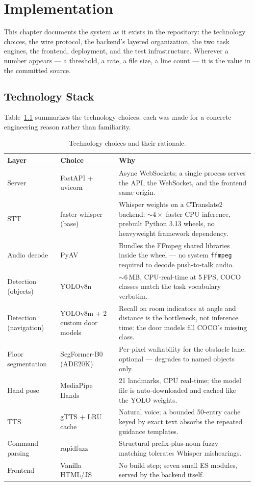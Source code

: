 \chapter{Implementation}
\label{ch:implementation}

This chapter documents the system as it exists in the repository: the technology
choices, the wire protocol, the backend's layered organization, the two task
engines, the frontend, deployment, and the test infrastructure. Wherever a number
appears --- a threshold, a rate, a file size, a line count --- it is the value in
the committed source.

\section{Technology Stack}
\label{sec:tech_stack}

Table~\ref{tab:stack} summarizes the technology choices; each was made for a
concrete engineering reason rather than familiarity.

\begin{table}[!htbp]
\centering
\caption{Technology choices and their rationale.}
\label{tab:stack}
\small
\begin{tabular}{p{2.6cm} p{3.2cm} p{7.0cm}}
\toprule
\textbf{Layer} & \textbf{Choice} & \textbf{Why} \\
\midrule
Server & FastAPI + uvicorn & Async WebSockets; a single process serves the API, the WebSocket, and the frontend same-origin. \\
STT & faster-whisper (base) & Whisper weights on a CTranslate2 backend: ${\sim}4\times$ faster CPU inference, prebuilt Python 3.13 wheels, no heavyweight framework dependency. \\
Audio decode & PyAV & Bundles the FFmpeg shared libraries inside the wheel --- no system \texttt{ffmpeg} required to decode push-to-talk audio. \\
Detection (objects) & YOLOv8n & ${\sim}6$\,MB, CPU-real-time at 5\,FPS, COCO classes match the task vocabulary verbatim. \\
Detection (navigation) & YOLOv8m + 2 custom door models & Recall on room indicators at angle and distance is the bottleneck, not inference time; the door models fill COCO's missing class. \\
Floor segmentation & SegFormer-B0 (ADE20K) & Per-pixel walkability for the obstacle lane; optional --- degrades to named objects only. \\
Hand pose & MediaPipe Hands & 21 landmarks, CPU real-time; the model file is auto-downloaded and cached like the YOLO weights. \\
TTS & gTTS + LRU cache & Natural voice; a bounded 50-entry cache keyed by exact text absorbs the repeated guidance templates. \\
Command parsing & rapidfuzz & Structural prefix-plus-noun fuzzy matching tolerates Whisper mishearings. \\
Frontend & Vanilla HTML/JS & No build step; seven small ES modules, served by the backend itself. \\
\bottomrule
\end{tabular}
\end{table}

